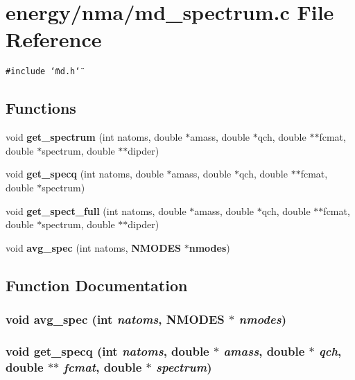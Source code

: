 \section{energy/nma/md\_\-spectrum.c File Reference}
\label{md__spectrum_8c}
{\tt \#include \char`\"{}md.h\char`\"{}}\par
\subsection*{Functions}
\begin{CompactItemize}
\item 
void {\bf get\_\-spectrum} (int natoms, double $\ast$amass, double $\ast$qch, double $\ast$$\ast$fcmat, double $\ast$spectrum, double $\ast$$\ast$dipder)
\item 
void {\bf get\_\-specq} (int natoms, double $\ast$amass, double $\ast$qch, double $\ast$$\ast$fcmat, double $\ast$spectrum)
\item 
void {\bf get\_\-spect\_\-full} (int natoms, double $\ast$amass, double $\ast$qch, double $\ast$$\ast$fcmat, double $\ast$spectrum, double $\ast$$\ast$dipder)
\item 
void {\bf avg\_\-spec} (int natoms, {\bf NMODES} $\ast${\bf nmodes})
\end{CompactItemize}


\subsection{Function Documentation}
\subsubsection{\setlength{\rightskip}{0pt plus 5cm}void avg\_\-spec (int {\em natoms}, {\bf NMODES} $\ast$ {\em nmodes})}\label{md__spectrum_8c_81fd172288cf19beb8a7b2c35b790ff4}


\subsubsection{\setlength{\rightskip}{0pt plus 5cm}void get\_\-specq (int {\em natoms}, double $\ast$ {\em amass}, double $\ast$ {\em qch}, double $\ast$$\ast$ {\em fcmat}, double $\ast$ {\em spectrum})}\label{md__spectrum_8c_1339566eac21d125963a8b9d0cd5e8b7}



